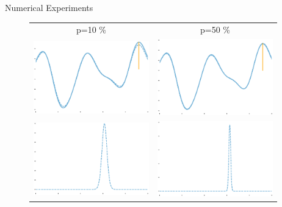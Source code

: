 \documentclass{beamer}
\begin{document}
\begin{frame}{Numerical Experiments}
	\begin{figure}[H]
		\centering
		\begin{tabular}{cc}
			
			p=10 \%& p=50 \% \\
			\includegraphics[width=5cm]{c_F_a_10.eps}&
			\includegraphics[width=5cm]{c_F_a_50.eps}\\
			
			\includegraphics[width=5cm]{c_P_x_10.eps}&
			\includegraphics[width=5cm]{c_P_x_50.eps}\\
			
		\end{tabular}
	\end{figure}
\end{frame}
\end{document}
